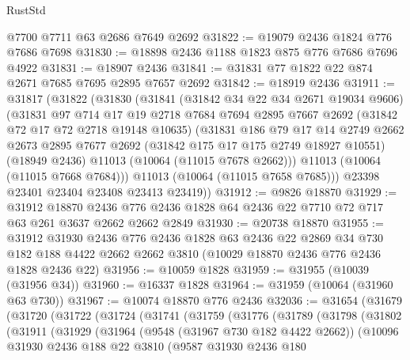 \begin{lexlean}{RustStd}
\begin{coremodule}
    @7700
    @7711
    @63
    @2686
    @7649
    @2692
@31822 := @19079 @2436 @1824 @776 @7686 @7698
@31830 := @18898 @2436 @1188 @1823 @875 @776 @7686 @7696 @4922
@31831 := @18907 @2436
@31841 := @31831 @77 @1822 @22 @874 @2671 @7685 @7695 @2895 @7657 @2692
@31842 := @18919 @2436
@31911 := @31817
    (@31822
      (@31830
        (@31841
          (@31842 @34 @22 @34 @2671 @19034 @9606)
          (@31831
            @97
            @714
            @17
            @19
            @2718
            @7684
            @7694
            @2895
            @7667
            @2692
            (@31842 @72 @17 @72 @2718 @19148 @10635)
            (@31831
              @186
              @79
              @17
              @14
              @2749
              @2662
              @2673
              @2895
              @7677
              @2692
              (@31842 @175 @17 @175 @2749 @18927 @10551)
              (@18949 @2436)
              @11013
              (@10064 (@11015 @7678 @2662)))
            @11013
            (@10064 (@11015 @7668 @7684)))
          @11013
          (@10064 (@11015 @7658 @7685)))
        @23398
        @23401
        @23404
        @23408
        @23413
        @23419))
@31912 := @9826 @18870
@31929 := @31912
    @18870
    @2436
    @776
    @2436
    @1828
    @64
    @2436
    @22
    @7710
    @72
    @717
    @63
    @261
    @3637
    @2662
    @2662
    @2849
@31930 := @20738 @18870
@31955 := @31912
    @31930
    @2436
    @776
    @2436
    @1828
    @63
    @2436
    @22
    @2869
    @34
    @730
    @182
    @188
    @4422
    @2662
    @2662
    @3810
    (@10029 @18870 @2436 @776 @2436 @1828 @2436 @22)
@31956 := @10059 @1828
@31959 := @31955 (@10039 (@31956 @34))
@31960 := @16337 @1828
@31964 := @31959 (@10064 (@31960 @63 @730))
@31967 := @10074 @18870 @776 @2436
@32036 := @31654
    (@31679
      (@31720
        (@31722
          (@31724
            (@31741
              (@31759
                (@31776
                  (@31789
                    (@31798
                      (@31802
                        (@31911
                          (@31929
                            (@31964
                              (@9548 (@31967 @730 @182 @4422 @2662))
                              (@10096
                                @31930
                                @2436
                                @188
                                @22
                                @3810
                                (@9587
                                  @31930
                                  @2436
                                  @180

\end{coremodule}
\end{lexlean}
